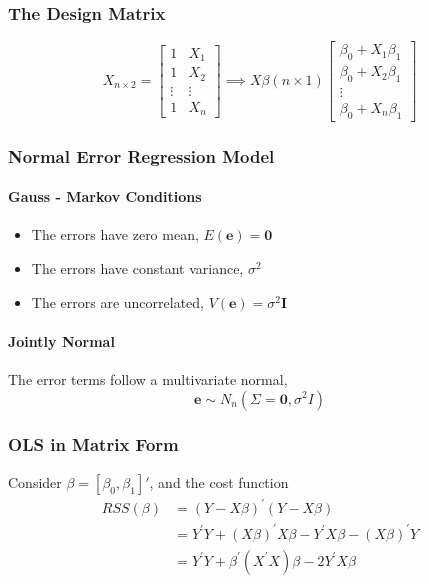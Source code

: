 \documentclass[11pt]{article}
\newcommand{\be}{\mathbf{e}}
\newcommand{\bzero}{\mathbf{0}}
\begin{document}
\subsubsection{The Design Matrix}
\begin{equation*}
    X_{n\times 2} = \begin{bmatrix}
        1 & X_1 \\
        1 & X_2 \\
        \vdots & \vdots \\
        1 & X_n
    \end{bmatrix}
    \implies
    X\beta (n\times 1)
    \begin{bmatrix}
        \beta_0 + X_1 \beta_1 \\
        \beta_0 + X_2 \beta_1 \\
        \vdots \\
        \beta_0 + X_n \beta_1
    \end{bmatrix}
\end{equation*}

\subsubsection{Normal Error Regression Model}
\paragraph{Gauss - Markov Conditions}
\begin{itemize}
    \item The errors have zero mean, $E(\be) = \bzero$
    \item The errors have constant variance, $\sigma^2$
    \item The errors are uncorrelated, $V(\be) = \sigma^2 \mathbf{I}$
\end{itemize}
\paragraph{Jointly Normal} The error terms follow a multivariate normal, 
\begin{equation*}
    \be \sim N_n (\Sigma = \bzero, \sigma^2 I)
\end{equation*}

\subsubsection{OLS in Matrix Form}
Consider $\beta = [\beta_0, \beta_1]'$, and the cost function
\begin{align*} 
    RSS(\beta) 
    &= ({Y}-{X} \beta)^{\prime}({Y}-{X} \beta) \\
    &={Y}^{\prime} {Y}+({X} \beta)^{\prime} {X} {\beta}-{Y}^{\prime} {X} {\beta}-({X} {\beta})^{\prime} {Y} \\ 
    &={Y}^{\prime} {Y}+\beta^{\prime}\left({X}^{\prime} {X}\right) \beta-2 {Y}^{\prime} {X} {\beta} 
\end{align*}
\end{document}
